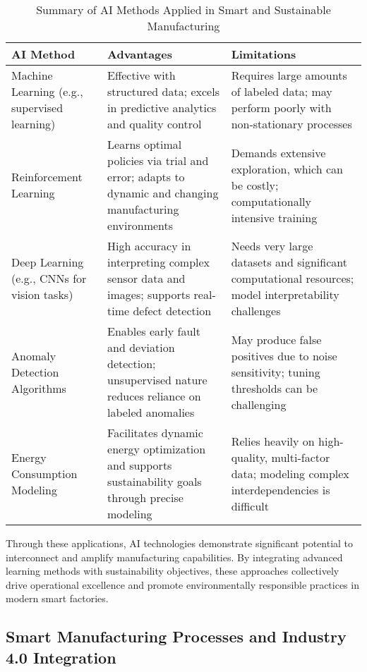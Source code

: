 \documentclass[sigconf]{acmart}
\begin{document}
\begin{table*}[htbp]
\centering
\caption{Summary of AI Methods Applied in Smart and Sustainable Manufacturing}
\label{tab:ai_methods_summary}
\begin{adjustbox}{max width=\textwidth}
\begin{tabular}{@{}lll@{}}
\toprule
\textbf{AI Method} & \textbf{Advantages} & \textbf{Limitations} \\ \midrule
Machine Learning (e.g., supervised learning) & Effective with structured data; excels in predictive analytics and quality control & Requires large amounts of labeled data; may perform poorly with non-stationary processes \\[6pt]
Reinforcement Learning & Learns optimal policies via trial and error; adapts to dynamic and changing manufacturing environments & Demands extensive exploration, which can be costly; computationally intensive training \\[6pt]
Deep Learning (e.g., CNNs for vision tasks) & High accuracy in interpreting complex sensor data and images; supports real-time defect detection & Needs very large datasets and significant computational resources; model interpretability challenges \\[6pt]
Anomaly Detection Algorithms & Enables early fault and deviation detection; unsupervised nature reduces reliance on labeled anomalies & May produce false positives due to noise sensitivity; tuning thresholds can be challenging \\[6pt]
Energy Consumption Modeling & Facilitates dynamic energy optimization and supports sustainability goals through precise modeling & Relies heavily on high-quality, multi-factor data; modeling complex interdependencies is difficult \\ \bottomrule
\end{tabular}
\end{adjustbox}
\end{table*}

Through these applications, AI technologies demonstrate significant potential to interconnect and amplify manufacturing capabilities. By integrating advanced learning methods with sustainability objectives, these approaches collectively drive operational excellence and promote environmentally responsible practices in modern smart factories.

\subsection{Smart Manufacturing Processes and Industry 4.0 Integration}
\end{document}
